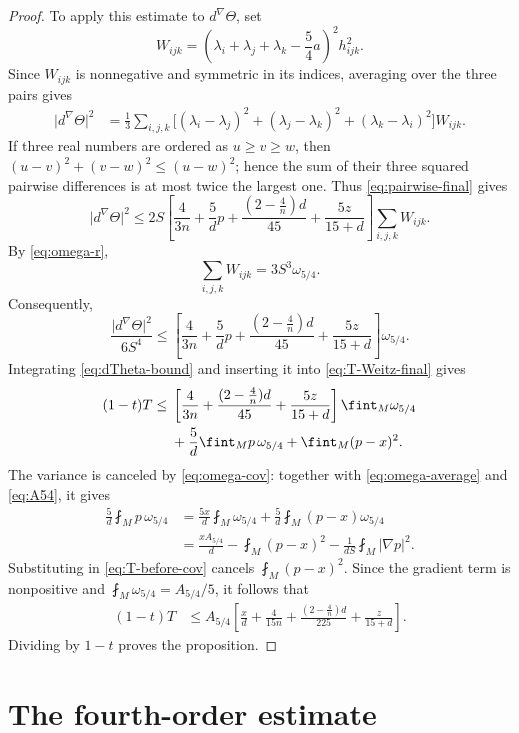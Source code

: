\documentclass[11pt,reqno]{amsart}
\numberwithin{equation}{section}
\newcommand{\norm}[1]{\lvert #1\rvert}
\begin{document}
\begin{proof}
To apply this estimate to $d^\nabla\Theta$, set
\[
W_{ijk}=\left(\lambda_i+\lambda_j+\lambda_k-\frac54a\right)^2h_{ijk}^2.
\]
Since $W_{ijk}$ is nonnegative and symmetric in its indices, averaging over the three pairs gives
\begin{align*}
\norm{d^\nabla\Theta}^2
&=\frac13\sum_{i,j,k}
\bigl[(\lambda_i-\lambda_j)^2+(\lambda_j-\lambda_k)^2
+(\lambda_k-\lambda_i)^2\bigr]W_{ijk}.
\end{align*}
If three real numbers are ordered as $u\ge v\ge w$, then
$(u-v)^2+(v-w)^2\le(u-w)^2$; hence the sum of their three squared pairwise differences is at most twice the largest one. Thus \eqref{eq:pairwise-final} gives
\[
\norm{d^\nabla\Theta}^2
\le
2S\left[
\frac4{3n}+\frac5d p
+\frac{(2-\frac4n)d}{45}
+\frac{5z}{15+d}
\right]
\sum_{i,j,k}W_{ijk}.
\]
By \eqref{eq:omega-r},
\[
\sum_{i,j,k}W_{ijk}=3S^3\omega_{5/4}.
\]
Consequently,
\begin{equation}\label{eq:dTheta-bound}
\frac{\norm{d^\nabla\Theta}^2}{6S^4}
\le
\left[
\frac4{3n}+\frac5d p
+\frac{(2-\frac4n)d}{45}
+\frac{5z}{15+d}
\right]\omega_{5/4}.
\end{equation}
Integrating \eqref{eq:dTheta-bound} and inserting it into \eqref{eq:T-Weitz-final} gives
\begin{align}
(1-t)T
\le{}&
\left[
\frac4{3n}
+\frac{(2-\frac4n)d}{45}
+\frac{5z}{15+d}
\right]\fint_M\omega_{5/4}\notag\\
&+\frac5d\fint_Mp\,\omega_{5/4}
+\fint_M(p-x)^2.
\label{eq:T-before-cov}
\end{align}
The variance is canceled by \eqref{eq:omega-cov}: together with \eqref{eq:omega-average} and \eqref{eq:A54}, it gives
\begin{align*}
\frac5d\fint_Mp\,\omega_{5/4}
&=\frac{5x}{d}\fint_M\omega_{5/4}
+\frac5d\fint_M(p-x)\omega_{5/4}\\
&=\frac{xA_{5/4}}d-\fint_M(p-x)^2
-\frac1{dS}\fint_M\norm{\nabla p}^2.
\end{align*}
Substituting in \eqref{eq:T-before-cov} cancels $\fint_M(p-x)^2$. Since the gradient term is nonpositive and $\fint_M\omega_{5/4}=A_{5/4}/5$, it follows that
\begin{align*}
(1-t)T
&\le A_{5/4}\left[
\frac xd+\frac4{15n}
+\frac{(2-\frac4n)d}{225}
+\frac z{15+d}\right].
\end{align*}
Dividing by $1-t$ proves the proposition.
\end{proof}

\section{The fourth-order estimate}\label{sec:fourth}
\end{document}
